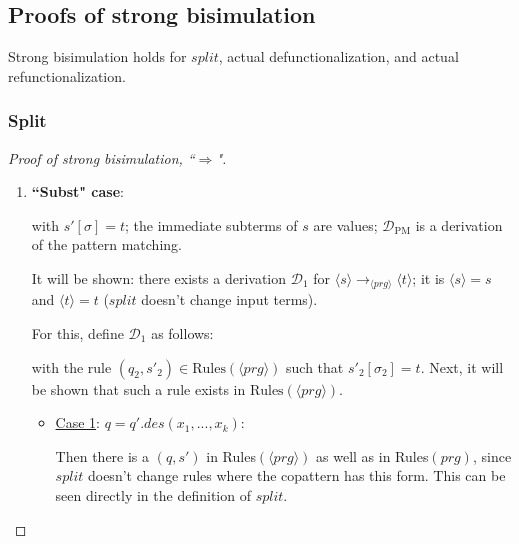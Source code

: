 \documentclass[11pt]{article} %
\begin{document}
\subsection{Proofs of strong bisimulation}

Strong bisimulation holds for $split$, actual defunctionalization, and actual refunctionalization.

\subsubsection{Split}

\begin{proof}[Proof of strong bisimulation, ``$\Rightarrow$"] ~

\begin{enumerate}
\item \textbf{``Subst" case}:

\begin{prooftree}
\end{prooftree}

with $s'[\sigma] = t$; the immediate subterms of $s$ are values; $\mathcal{D}_{\textrm{PM}}$ is a derivation of the pattern matching.

It will be shown: there exists a derivation $\mathcal{D}_1$ for $\langle s \rangle \longrightarrow_{\langle prg \rangle} \langle t \rangle$; it is $\langle s \rangle = s$ and $\langle t \rangle = t$ ($split$ doesn't change input terms).

For this, define $\mathcal{D}_1$ as follows:

\begin{prooftree}
\end{prooftree}

with the rule $(q_2, s'_2) \in \textrm{Rules}(\langle prg \rangle)$ such that $s'_2[\sigma_2] = t$. Next, it will be shown that such a rule exists in $\textrm{Rules}(\langle prg \rangle)$.

\begin{itemize}
\item \underline{Case 1}: $q = q'.des(x_1, ..., x_k)$:

Then there is a $(q, s')$ in Rules$(\langle prg \rangle)$ as well as in Rules$(prg)$, since $split$ doesn't change rules where the copattern has this form. This can be seen directly in the definition of $split$.


\end{itemize}
\end{enumerate}
\end{proof}
\end{document}
